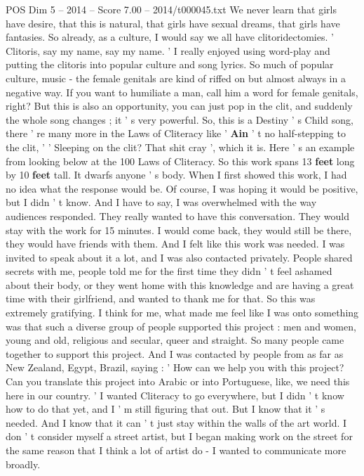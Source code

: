 \begin{textsample}{POS Dim 5 – 2014 – Score 7.00 – 2014/t000045.txt}
We never learn that girls have desire, that this is natural, that girls have sexual dreams, that girls have fantasies.
So already, as a culture, I would say we all have clitoridectomies. ' Clitoris, say my name, say my name. ' I really enjoyed using word-play and putting the clitoris into popular culture and song lyrics.
So much of popular culture, music - the female genitals are kind of riffed on but almost always in a negative way.
If you want to humiliate a man, call him a word for female genitals, right?
But this is also an opportunity, you can just pop in the clit, and suddenly the whole song changes ; it ' s very powerful.
So, this is a Destiny ' s Child song, there ' re many more in the Laws of Cliteracy like ' \textbf{Ain} ' t no half-stepping to the clit, ' ' Sleeping on the clit?
That shit cray ', which it is.
Here ' s an example from looking below at the 100 Laws of Cliteracy.
So this work spans 13 \textbf{feet} long by 10 \textbf{feet} tall.
It dwarfs anyone ' s body.
When I first showed this work, I had no idea what the response would be.
Of course, I was hoping it would be positive, but I didn ' t know.
And I have to say, I was overwhelmed with the way audiences responded.
They really wanted to have this conversation.
They would stay with the work for 15 minutes.
I would come back, they would still be there, they would have friends with them.
And I felt like this work was needed.
I was invited to speak about it a lot, and I was also contacted privately.
People shared secrets with me, people told me for the first time they didn ' t feel ashamed about their body, or they went home with this knowledge and are having a great time with their girlfriend, and wanted to thank me for that.
So this was extremely gratifying.
I think for me, what made me feel like I was onto something was that such a diverse group of people supported this project : men and women, young and old, religious and secular, queer and straight.
So many people came together to support this project.
And I was contacted by people from as far as New Zealand, Egypt, Brazil, saying : ' How can we help you with this project?
Can you translate this project into Arabic or into Portuguese, like, we need this here in our country. ' I wanted Cliteracy to go everywhere, but I didn ' t know how to do that yet, and I ' m still figuring that out.
But I know that it ' s needed.
And I know that it can ' t just stay within the walls of the art world.
I don ' t consider myself a street artist, but I began making work on the street for the same reason that I think a lot of artist do - I wanted to communicate more broadly.

\end{textsample}
